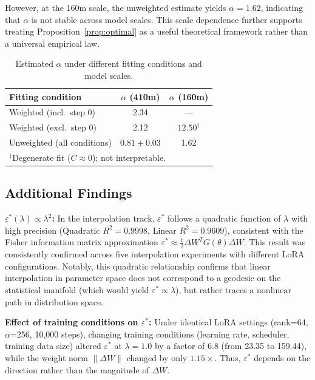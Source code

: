 \documentclass[11pt,a4paper]{article}
\begin{document}
However, at the 160m scale, the unweighted estimate yields $\alpha = 1.62$, indicating that
$\alpha$ is not stable across model scales. This scale dependence further supports treating
Proposition~\ref{prop:optimal} as a useful theoretical framework rather than a universal
empirical law.

\begin{table}[t]
\centering
\caption{Estimated $\alpha$ under different fitting conditions and model scales.}
\label{tab:alpha}
\begin{tabular}{lcc}
\toprule
Fitting condition & $\alpha$ (410m) & $\alpha$ (160m) \\
\midrule
Weighted (incl.\ step 0) & 2.34 & --- \\
Weighted (excl.\ step 0) & 2.12 & $12.50^\dagger$ \\
Unweighted (all conditions) & $0.81 \pm 0.03$ & 1.62 \\
\bottomrule
\multicolumn{3}{l}{\footnotesize $^\dagger$Degenerate fit ($C \approx 0$); not interpretable.}
\end{tabular}
\end{table}

\subsection{Additional Findings}

\textbf{$\varepsilon^*(\lambda) \propto \lambda^2$:} In the interpolation track,
$\varepsilon^*$ follows a quadratic function of $\lambda$ with high precision (Quadratic
$R^2 = 0.9998$, Linear $R^2 = 0.9609$), consistent with the Fisher information matrix
approximation \cite{amari2000}
$\varepsilon^* \approx \frac{1}{2}\Delta W^T G(\theta)\Delta W$. This result was consistently
confirmed across five interpolation experiments with different LoRA configurations. Notably,
this quadratic relationship confirms that linear interpolation in parameter space does not
correspond to a geodesic on the statistical manifold (which would yield
$\varepsilon^* \propto \lambda$), but rather traces a nonlinear path in distribution space.

\textbf{Effect of training conditions on $\varepsilon^*$:} Under identical LoRA settings
(rank=64, $\alpha$=256, 10,000 steps), changing training conditions (learning rate, scheduler,
training data size) altered $\varepsilon^*$ at $\lambda = 1.0$ by a factor of 6.8 (from 23.35
to 159.44), while the weight norm $\|\Delta W\|$ changed by only $1.15\times$. Thus,
$\varepsilon^*$ depends on the direction rather than the magnitude of $\Delta W$.
\end{document}
